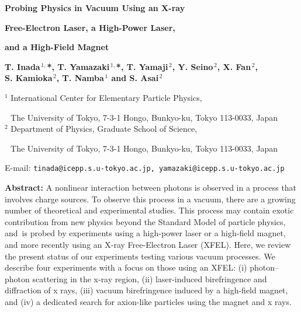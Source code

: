 \documentclass[10pt,a4paper]{article}%
\begin{document}
$\,$

\vspace{60pt}

\begin{spacing}{1.8}
\begin{flushleft}
{\bf\LARGE Probing Physics in Vacuum Using an X-ray}

{\bf\LARGE Free-Electron Laser, a High-Power Laser,}

{\bf\LARGE and a High-Field Magnet}
\end{flushleft}
\end{spacing}

\vspace{-10pt}

\begin{flushright}
\begin{minipage}{0.85\hsize}
\begin{spacing}{1.2}
{\bf T. Inada$^{\,1,}$*, T. Yamazaki$^{\,1,}$*, T. Yamaji$^{\,2}$, Y. Seino$^{\,2}$, X. Fan$^{\,2}$,\\S. Kamioka$^{\,2}$, T. Namba$^{\,1}$ and S. Asai$^{\,2}$}
\end{spacing}

\vspace{5pt}

{\small
$^{1}$ \quad International Center for Elementary Particle Physics,

$\, \:$ \quad The University of Tokyo, 7-3-1 Hongo, Bunkyo-ku, Tokyo 113-0033, Japan\\
$^{2}$
\quad Department of Physics, Graduate School of Science,

$\, \:$ \quad The University of Tokyo, 7-3-1 Hongo, Bunkyo-ku, Tokyo 113-0033, Japan
}

\vspace{5pt}

E-mail: {\tt tinada@icepp.s.u-tokyo.ac.jp, yamazaki@icepp.s.u-tokyo.ac.jp}

\vspace{15pt}

{\bf Abstract:} A nonlinear interaction between photons is observed in a process that involves charge sources.
To observe this process in a vacuum, there are a growing number of theoretical and experimental studies.
This process may contain exotic contribution from new physics beyond the Standard Model of particle physics, and~is probed by experiments using a high-power laser or a high-field magnet, and more recently using an X-ray Free-Electron Laser (XFEL).
Here, we review the present status of our experiments testing various vacuum processes.
We describe four experiments with a focus on those using an XFEL: (i) photon--photon scattering in the x-ray region, (ii) laser-induced birefringence and diffraction of x rays, (iii) vacuum birefringence induced by a high-field magnet, and (iv) a dedicated search for axion-like particles using the magnet and x rays.
\end{minipage}
\end{flushright}
\end{document}
